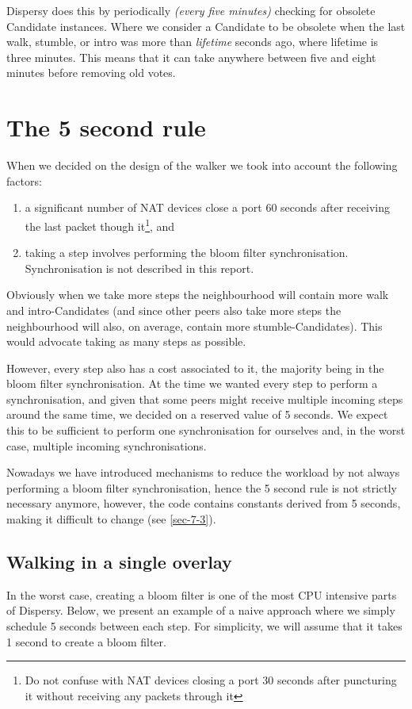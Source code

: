 Dispersy does this by periodically \emph{(every five minutes)} checking for
obsolete Candidate instances.  Where we consider a Candidate to be
obsolete when the last walk, stumble, or intro was more than
\emph{lifetime} seconds ago, where lifetime is three minutes.  This means
that it can take anywhere between five and eight minutes before
removing old votes.
\section{The 5 second rule}
\label{sec-7}
When we decided on the design of the walker we took into account the
following factors:
\begin{enumerate}
\item a significant number of NAT devices close a port 60 seconds after
receiving the last packet though it\footnote{Do not confuse with NAT
   devices closing a port 30 seconds after puncturing it without
   receiving any packets through it}, and
\item taking a step involves performing the bloom filter synchronisation.
Synchronisation is not described in this report.
\end{enumerate}

Obviously when we take more steps the neighbourhood will contain more
walk and intro-Candidates (and since other peers also take more steps
the neighbourhood will also, on average, contain more
stumble-Candidates).  This would advocate taking as many steps as
possible.

However, every step also has a cost associated to it, the majority
being in the bloom filter synchronisation.  At the time we wanted
every step to perform a synchronisation, and given that some peers
might receive multiple incoming steps around the same time, we decided
on a reserved value of 5 seconds.  We expect this to be sufficient to
perform one synchronisation for ourselves and, in the worst case,
multiple incoming synchronisations.

Nowadays we have introduced mechanisms to reduce the workload by not
always performing a bloom filter synchronisation, hence the 5 second
rule is not strictly necessary anymore, however, the code contains
constants derived from 5 seconds, making it difficult to change (see
\ref{sec-7-3}).

\subsection{Walking in a single overlay}
\label{sec-7-1}
In the worst case, creating a bloom filter is one of the most CPU
intensive parts of Dispersy.  Below, we present an example of a naive
approach where we simply schedule 5 seconds between each step.  For
simplicity, we will assume that it takes 1 second to create a bloom
filter.

